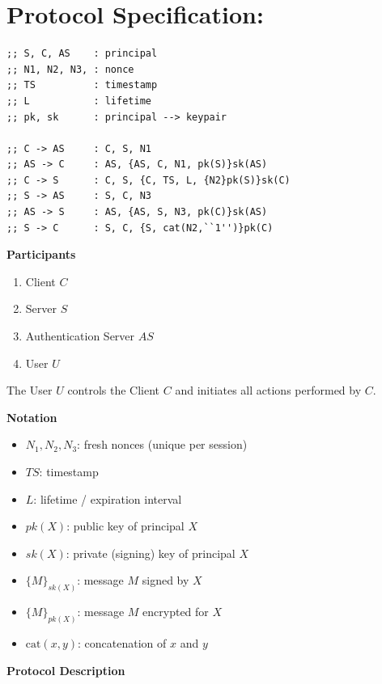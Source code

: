 \documentclass[12pt]{article}
\begin{document}
 

\vfill
\pagebreak

\section{Protocol Specification:}

\begin{lstlisting}
;; S, C, AS    : principal
;; N1, N2, N3, : nonce
;; TS          : timestamp
;; L           : lifetime
;; pk, sk      : principal --> keypair

;; C -> AS     : C, S, N1
;; AS -> C     : AS, {AS, C, N1, pk(S)}sk(AS)
;; C -> S      : C, S, {C, TS, L, {N2}pk(S)}sk(C)
;; S -> AS     : S, C, N3
;; AS -> S     : AS, {AS, S, N3, pk(C)}sk(AS)
;; S -> C      : S, C, {S, cat(N2,``1'')}pk(C)  
\end{lstlisting}

\noindent
\textbf{Participants}

\begin{enumerate}[nosep]
\item Client $C$
\item Server $S$
\item Authentication Server $AS$
\item User $U$
\end{enumerate}

The User $U$ controls the Client $C$ and initiates all actions performed by $C$.

\vspace{0.5em}
\noindent
\textbf{Notation}

\begin{itemize}[nosep]
\item $N_1, N_2, N_3$: fresh nonces (unique per session)
\item $TS$: timestamp
\item $L$: lifetime / expiration interval
\item $pk(X)$: public key of principal $X$
\item $sk(X)$: private (signing) key of principal $X$
\item $\{M\}_{sk(X)}$: message $M$ signed by $X$
\item $\{M\}_{pk(X)}$: message $M$ encrypted for $X$
\item $\text{cat}(x,y)$: concatenation of $x$ and $y$
\end{itemize}

\vspace{0.5em}
\noindent
\textbf{Protocol Description}
\end{document}
